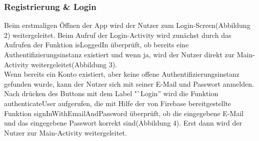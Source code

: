 \documentclass[12pt, a4paper, oneside]{article}
\begin{document}
\subsubsection{Registrierung \& Login}
Beim erstmaligen Öffnen der App wird der Nutzer zum Login-Screen(Abbildung 2) weitergeleitet.  Beim Aufruf der Login-Activity wird zunächst durch das Aufrufen der Funktion isLoggedIn überprüft, ob bereits eine Authentifizierungsinstanz existiert und wenn ja, wird der Nutzer direkt zur Main-Activity weitergeleitet(Abbildung 3).\\

Wenn bereits ein Konto existiert, aber keine offene Authentifizierungsinstanz gefunden wurde, kann der Nutzer sich mit seiner E-Mail und Passwort anmelden. Nach drücken des Buttons mit dem Label "`Login'' wird die Funktion authenticateUser aufgerufen, die mit Hilfe der von Firebase bereitgestellte Funktion signInWithEmailAndPassword überprüft, ob die eingegebene E-Mail und das eingegebene Passwort korrekt sind(Abbildung 4). Erst dann wird der Nutzer zur Main-Activity weitergeleitet.\\ 
\end{document}
